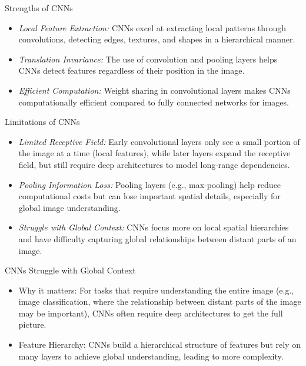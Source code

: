 \begin{frame}{Strengths of CNNs}
    \begin{itemize}
        \item \emph{Local Feature Extraction:} CNNs excel at extracting local patterns through convolutions, detecting edges, textures, and shapes in a hierarchical manner.
        \item \emph{Translation Invariance:} The use of convolution and pooling layers helps CNNs detect features regardless of their position in the image.
        \item \emph{Efficient Computation:} Weight sharing in convolutional layers makes CNNs computationally efficient compared to fully connected networks for images.
    \end{itemize}
\end{frame}

\begin{frame}{Limitations of CNNs}
    \begin{itemize}
        \item \emph{Limited Receptive Field:} Early convolutional layers only see a small portion of the image at a time (local features), while later layers expand the receptive field, but still require deep architectures to model long-range dependencies.
        \item \emph{Pooling Information Loss:} Pooling layers (e.g., max-pooling) help reduce computational costs but can lose important spatial details, especially for global image understanding.
        \item \emph{Struggle with Global Context:} CNNs focus more on local spatial hierarchies and have difficulty capturing global relationships between distant parts of an image.
    \end{itemize}
\end{frame}

\begin{frame}{CNNs Struggle with Global Context}
    \begin{itemize}
        \item Why it matters: For tasks that require understanding the entire image (e.g., image classification, where the relationship between distant parts of the image may be important), CNNs often require deep architectures to get the full picture.
        \item Feature Hierarchy: CNNs build a hierarchical structure of features but rely on many layers to achieve global understanding, leading to more complexity.
    \end{itemize}
\end{frame}

